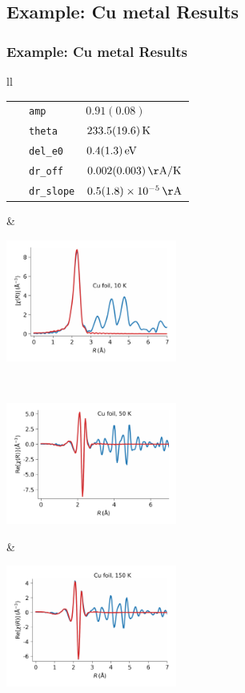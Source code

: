 \subsection{Example: Cu metal Results}
\begin{frame}[fragile] \frametitle{Example: Cu metal Results}

  \begin{cenpage}{135mm}

  \begin{tabular}{ll}
    \begin{minipage}{60mm}
      \begin{tabular}{lll}
        {\ } &{\tt{amp}}  &   $0.91(0.08)$ \\
        &{\tt{theta}}  &   $233.5(19.6) \rm\, K $ \\
        &{\tt{del\_e0}}  &   $0.4(1.3) \rm \, eV$ \\
        & {\tt{dr\_off}} &   $0.002(0.003) \rm \, {\AA}/K $ \\
        &{\tt{dr\_slope}}   &    $0.5(1.8)\times 10^{-5} \rm \, {\AA}$ \\
      \end{tabular}
  \vmm
\end{minipage} &
\begin{minipage}{60mm}
  \includegraphics[width=56mm]{figs/Cu3temp/cu3temp_mag10}
\end{minipage} \\
\begin{minipage}{60mm}
  \includegraphics[width=56mm]{figs/Cu3temp/cu3temp_re50}
\end{minipage} &
\begin{minipage}{60mm}
  \includegraphics[width=56mm]{figs/Cu3temp/cu3temp_re150}
\end{minipage}\\
  \end{tabular}
\end{cenpage}


\end{frame}
